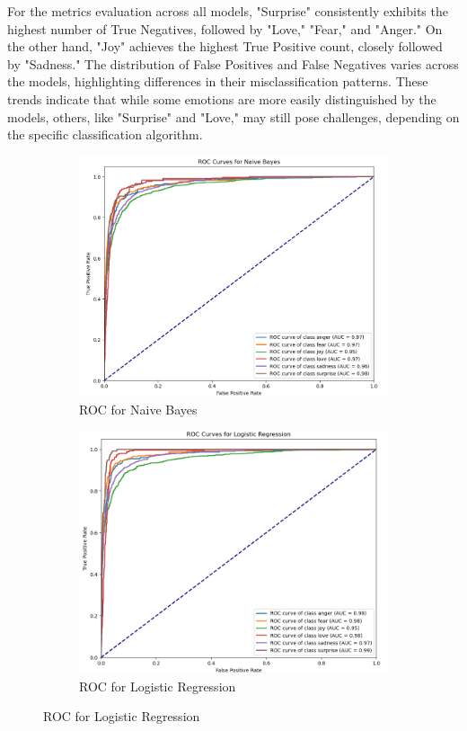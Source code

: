 For the metrics evaluation across all models, "Surprise" consistently exhibits the highest number of True Negatives, followed by "Love," "Fear," and "Anger." On the other hand, "Joy" achieves the highest True Positive count, closely followed by "Sadness." The distribution of False Positives and False Negatives varies across the models, highlighting differences in their misclassification patterns. These trends indicate that while some emotions are more easily distinguished by the models, others, like "Surprise" and "Love," may still pose challenges, depending on the specific classification algorithm.

\clearpage


\begin{figure}[h!]
	\centering
	\begin{subfigure}[b]{0.45\textwidth}
		\centering
		\includegraphics[width=\textwidth]{roc_naive_bayes.png}
		\caption{ROC for Naive Bayes}
		\label{fig:roc_naive_bayes}
	\end{subfigure}
	\hfill
	\begin{subfigure}[b]{0.45\textwidth}
		\centering
		\includegraphics[width=\textwidth]{roc_logistic_regression.png}
		\caption{ROC for Logistic Regression}
		\label{fig:roc_logistic_regression}
	\end{subfigure}
	

\end{figure}
